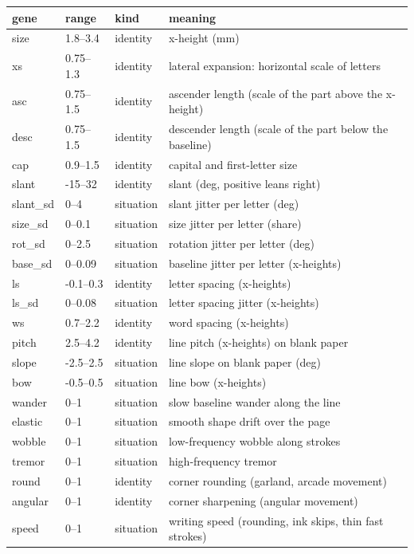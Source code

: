 \begin{table}[h]\centering\footnotesize
\begin{tabular}{lllp{}}\toprule
gene & range & kind & meaning\\\midrule
size & 1.8--3.4 & identity & x-height (mm)\\
xs & 0.75--1.3 & identity & lateral expansion: horizontal scale of letters\\
asc & 0.75--1.5 & identity & ascender length (scale of the part above the x-height)\\
desc & 0.75--1.5 & identity & descender length (scale of the part below the baseline)\\
cap & 0.9--1.5 & identity & capital and first-letter size\\
slant & -15--32 & identity & slant (deg, positive leans right)\\
slant\_sd & 0--4 & situation & slant jitter per letter (deg)\\
size\_sd & 0--0.1 & situation & size jitter per letter (share)\\
rot\_sd & 0--2.5 & situation & rotation jitter per letter (deg)\\
base\_sd & 0--0.09 & situation & baseline jitter per letter (x-heights)\\
ls & -0.1--0.3 & identity & letter spacing (x-heights)\\
ls\_sd & 0--0.08 & situation & letter spacing jitter (x-heights)\\
ws & 0.7--2.2 & identity & word spacing (x-heights)\\
pitch & 2.5--4.2 & identity & line pitch (x-heights) on blank paper\\
slope & -2.5--2.5 & situation & line slope on blank paper (deg)\\
bow & -0.5--0.5 & situation & line bow (x-heights)\\
wander & 0--1 & situation & slow baseline wander along the line\\
elastic & 0--1 & situation & smooth shape drift over the page\\
wobble & 0--1 & situation & low-frequency wobble along strokes\\
tremor & 0--1 & situation & high-frequency tremor\\
round & 0--1 & identity & corner rounding (garland, arcade movement)\\
angular & 0--1 & identity & corner sharpening (angular movement)\\
speed & 0--1 & situation & writing speed (rounding, ink skips, thin fast strokes)\\

\end{tabular}
\end{table}
